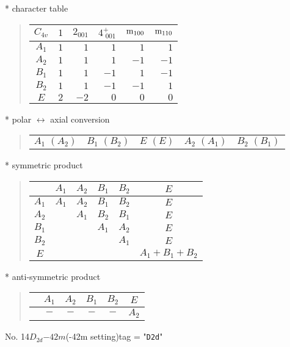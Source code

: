 \documentclass[fleqn,10pt,landscape]{jsarticle}
\begin{document}
* character table
\begin{quote}
\begin{tabular}{crrrrr} \hline \hline
$ C_{4v} $ & $ 1 $ & $ 2{}_{001} $ & $ 4^{+}_{\,\,001} $ & $ {\rm m}_{100} $ & $ {\rm m}_{110} $ \\ \hline
$ A_{1} $ & $ 1 $ & $ 1 $ & $ 1 $ & $ 1 $ & $ 1 $ \\
$ A_{2} $ & $ 1 $ & $ 1 $ & $ 1 $ & $ -1 $ & $ -1 $ \\
$ B_{1} $ & $ 1 $ & $ 1 $ & $ -1 $ & $ 1 $ & $ -1 $ \\
$ B_{2} $ & $ 1 $ & $ 1 $ & $ -1 $ & $ -1 $ & $ 1 $ \\
$ E $ & $ 2 $ & $ -2 $ & $ 0 $ & $ 0 $ & $ 0 $ \\
 \hline \hline
\end{tabular}
\end{quote}
* polar $\leftrightarrow$ axial conversion
\begin{quote}
\begin{tabular}{ccccc}
$ A_{1}\,\,(A_{2}) $ & $ B_{1}\,\,(B_{2}) $ & $ E\,\,(E) $ & $ A_{2}\,\,(A_{1}) $ & $ B_{2}\,\,(B_{1}) $
\end{tabular}
\end{quote}
* symmetric product
\begin{quote}
\begin{tabular}{c|ccccc} \hline \hline
 & $ A_{1} $ & $ A_{2} $ & $ B_{1} $ & $ B_{2} $ & $ E $ \\ \hline
$ A_{1} $ & $ A_{1} $ & $ A_{2} $ & $ B_{1} $ & $ B_{2} $ & $ E $ \\
$ A_{2} $ & $  $ & $ A_{1} $ & $ B_{2} $ & $ B_{1} $ & $ E $ \\
$ B_{1} $ & $  $ & $  $ & $ A_{1} $ & $ A_{2} $ & $ E $ \\
$ B_{2} $ & $  $ & $  $ & $  $ & $ A_{1} $ & $ E $ \\
$ E $ & $  $ & $  $ & $  $ & $  $ & $ A_{1} + B_{1} + B_{2} $ \\
 \hline \hline
\end{tabular}
\end{quote}
* anti-symmetric product
\begin{quote}
\begin{tabular}{cccccc} \hline \hline
 & $ A_{1} $ & $ A_{2} $ & $ B_{1} $ & $ B_{2} $ & $ E $ \\ \hline
$  $ & $ - $ & $ - $ & $ - $ & $ - $ & $ A_{2} $ \\
 \hline \hline
\end{tabular}
\end{quote}
\newpage
No. 14\quad$D_{2d}$\quad$-42m$\quad(-42m setting)\quad[ tetragonal ]
tag = "{\tt D2d}"
\end{document}
